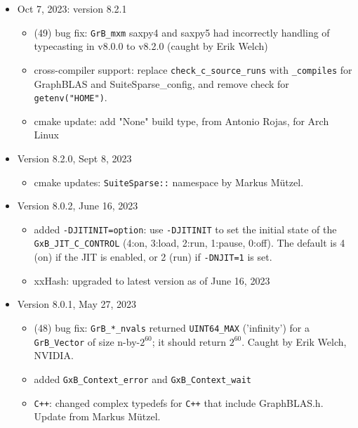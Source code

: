 \documentclass[12pt]{article}
\begin{document}
\begin{itemize}
\item Oct 7, 2023: version 8.2.1

    \begin{itemize}
    \item (49) bug fix: \verb'GrB_mxm' saxpy4 and saxpy5 had incorrectly handling of
        typecasting in v8.0.0 to v8.2.0 (caught by Erik Welch)
    \item cross-compiler support: replace \verb'check_c_source_runs' with \verb'_compiles'
        for GraphBLAS and SuiteSparse\_config, and remove check for
        \verb'getenv("HOME")'.
    \item cmake update: add "None" build type, from Antonio Rojas, for Arch Linux
    \end{itemize}

\item Version 8.2.0, Sept 8, 2023

    \begin{itemize}
    \item cmake updates: \verb'SuiteSparse::' namespace by Markus M\"{u}tzel.
    \end{itemize}

\item Version 8.0.2, June 16, 2023

    \begin{itemize}
    \item added \verb'-DJITINIT=option':  use \verb'-DJITINIT' to set the
        initial state of the \verb'GxB_JIT_C_CONTROL' (4:on, 3:load, 2:run,
        1:pause, 0:off).  The default is 4 (on) if the JIT is enabled, or 2
        (run) if \verb'-DNJIT=1' is set.
    \item xxHash: upgraded to latest version as of June 16, 2023
    \end{itemize}

\item Version 8.0.1, May 27, 2023

    \begin{itemize}
    \item (48) bug fix: \verb'GrB_*_nvals'
        returned \verb'UINT64_MAX' ('infinity') for a
        \verb'GrB_Vector' of size n-by-$2^{60}$; it should return $2^{60}$.
        Caught by Erik Welch, NVIDIA.
    \item added \verb'GxB_Context_error' and \verb'GxB_Context_wait'
    \item \verb'C++': changed complex typedefs for \verb'C++' that
        include GraphBLAS.h.  Update from Markus M\"{u}tzel.
    \end{itemize}


\end{itemize}
\end{document}
